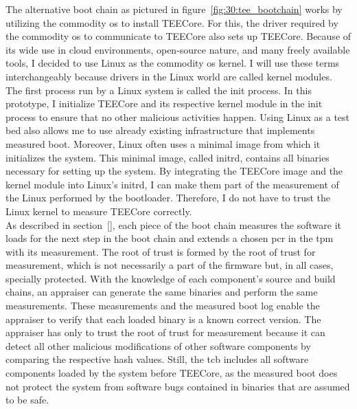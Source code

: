 The alternative boot chain as pictured in figure~\ref{fig:30:tee_bootchain}
works by utilizing the commodity \gls{os} to install TEECore. For this, the
driver required by the commodity \gls{os} to communicate to TEECore also sets up
TEECore. Because of its wide use in cloud environments, open-source nature, and
many freely available tools, I decided to use Linux as the commodity \gls{os}
kernel. I will use these terms interchangeably because drivers in the Linux
world are called kernel modules. The first process run by a Linux system is
called the init process. In this prototype, I initialize TEECore and its
respective kernel module in the init process to ensure that no other malicious
activities happen. Using Linux as a test bed also allows me to use already
existing infrastructure that implements measured boot. Moreover, Linux often
uses a minimal image from which it initializes the system. This minimal image,
called initrd, contains all binaries necessary for setting up the system. By
integrating the TEECore image and the kernel module into Linux's initrd, I can
make them part of the measurement of the Linux performed by the bootloader.
Therefore, I do not have to trust the Linux kernel to measure TEECore correctly.
\\

As described in section~\ref{}, each
piece of the boot chain measures the software it loads for the next step in the
boot chain and extends a chosen \gls{pcr} in the \gls{tpm} with its measurement.
The root of trust is formed by the root of trust for measurement, which is not
necessarily a part of the firmware but, in all cases, specially protected. With
the knowledge of each component's source and build chains, an appraiser can
generate the same binaries and perform the same measurements. These measurements
and the measured boot log enable the appraiser to verify that each loaded binary
is a known correct version. The appraiser has only to trust the root of trust
for measurement because it can detect all other malicious modifications of other
software components by comparing the respective hash values. Still, the
\gls{tcb} includes all software components loaded by the system before TEECore,
as the measured boot does not protect the system from software bugs contained in
binaries that are assumed to be safe.

